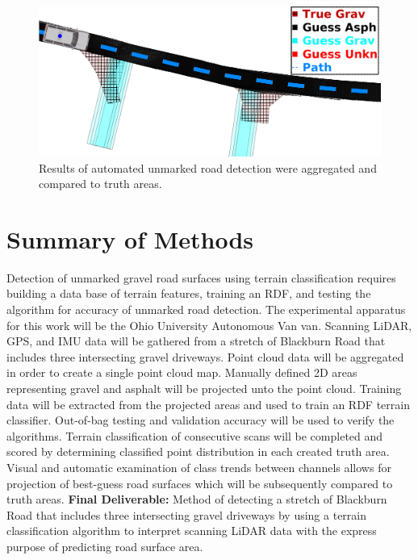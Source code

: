 \documentclass[numbered,pdftex]{ohio-etd}
\begin{document}
{{		\begin{figure}[H]
			\centering
			\includegraphics[width=0.9\linewidth]{Defense_Images/auto_guess_v_truth}
			\caption[Projected Automated Guess vs Truth]{Results of automated unmarked road detection were aggregated and compared to truth areas.}
			\label{fig:auto_guess_v_truth}
		\end{figure}	
		
	}
		


\newpage
	
	
	\section{Summary of Methods}\label{sec:summary-of-methods}{
		
		{Detection of unmarked gravel road surfaces using terrain classification requires building a data base of terrain features, training an RDF, and testing the algorithm for accuracy of unmarked road detection. The experimental apparatus for this work will be the Ohio University Autonomous Van van. Scanning LiDAR, GPS, and IMU data will be gathered from a stretch of Blackburn Road that includes three intersecting gravel driveways. Point cloud data will be aggregated in order to create a single point cloud map. Manually defined 2D areas representing gravel and asphalt will be projected unto the point cloud. Training data will be extracted from the projected areas and used to train an RDF terrain classifier. Out-of-bag testing and validation accuracy will be used to verify the algorithms. Terrain classification of consecutive scans will be completed and scored by determining classified point distribution in each created truth area. Visual and automatic examination of class trends between channels allows for projection of best-guess road surfaces which will be subsequently compared to truth areas. \textbf{Final Deliverable:} Method of detecting a stretch of Blackburn Road that includes three intersecting gravel driveways by using a terrain classification algorithm to interpret scanning LiDAR data with the express purpose of predicting road surface area.}
		
	} %
	
} %
\end{document}
